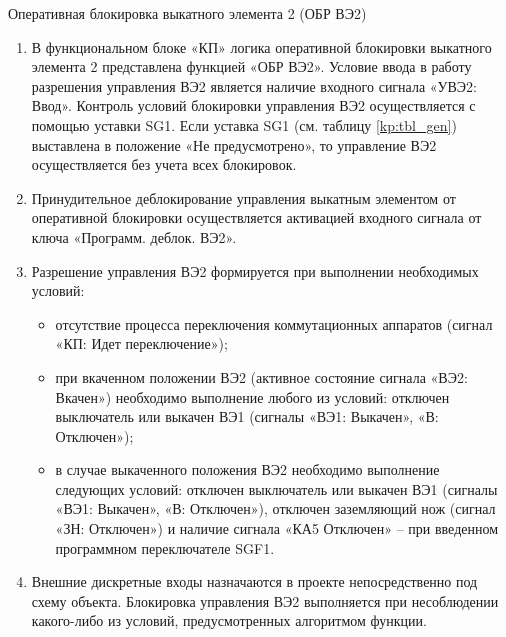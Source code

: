 \begin{enumerate}
{\begin{enumerate}
\end{enumerate}

\item Оперативная блокировка выкатного элемента 2 (ОБР ВЭ2)

\begin{enumerate}

\item
В функциональном блоке «КП» логика оперативной блокировки выкатного элемента 2 представлена функцией «ОБР ВЭ2». Условие ввода в работу разрешения управления ВЭ2 является наличие входного сигнала «УВЭ2: Ввод». Контроль условий блокировки управления ВЭ2 осуществляется с помощью уставки SG1. Если уставка SG1 (см. таблицу \ref{kp:tbl_gen}) выставлена в положение «Не предусмотрено», то управление ВЭ2 осуществляется без учета всех блокировок.

\item
Принудительное деблокирование управления выкатным элементом от оперативной блокировки осуществляется активацией входного сигнала от ключа «Программ. деблок. ВЭ2».

\item
Разрешение управления ВЭ2 формируется при выполнении необходимых условий:
\begin{itemize}
	\item отсутствие процесса переключения коммутационных аппаратов (сигнал «КП: Идет переключение»);
	\item при вкаченном положении ВЭ2 (активное состояние сигнала «ВЭ2: Вкачен») необходимо выполнение любого из условий: отключен выключатель или выкачен ВЭ1 (сигналы «ВЭ1: Выкачен», «В: Отключен»);
	\item в случае выкаченного положения ВЭ2 необходимо выполнение следующих условий: отключен выключатель или выкачен ВЭ1 (сигналы «ВЭ1: Выкачен», «В: Отключен»), отключен заземляющий нож (сигнал «ЗН: Отключен») и наличие сигнала «КА5 Отключен» -- при введенном программном переключателе SGF1.
\end{itemize}

\item\sloppy
Внешние дискретные входы назначаются в проекте непосредственно под схему объекта. Блокировка управления ВЭ2 выполняется при несоблюдении какого-либо из условий, предусмотренных алгоритмом функции.


\end{enumerate}}
\end{enumerate}
